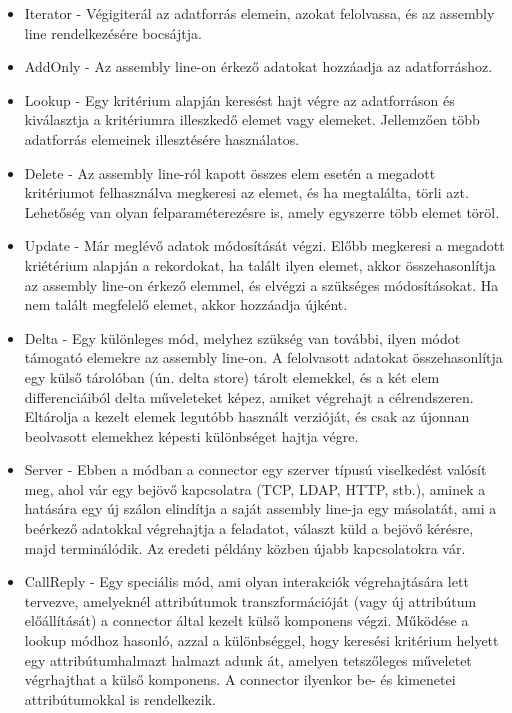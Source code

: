 \begin{itemize}
	\item Iterator - Végigiterál az adatforrás elemein, azokat felolvassa, és az assembly line rendelkezésére bocsájtja.
	
	\item AddOnly - Az assembly line-on érkező adatokat hozzáadja az adatforráshoz.
	
	\item Lookup - Egy kritérium alapján keresést hajt végre az adatforráson és kiválasztja a kritériumra illeszkedő elemet vagy elemeket. Jellemzően több adatforrás elemeinek illesztésére használatos.
	
	\item Delete - Az assembly line-ról kapott összes elem esetén a megadott kritériumot felhasználva megkeresi az elemet, és ha megtalálta, törli azt. Lehetőség van olyan felparaméterezésre is, amely egyszerre több elemet töröl.
	
	\item Update - Már meglévő adatok módosítását végzi. Előbb  megkeresi a megadott kriétérium alapján a rekordokat, ha talált ilyen elemet, akkor összehasonlítja az assembly line-on érkező elemmel, és elvégzi a szükséges módosításokat. Ha nem talált megfelelő elemet, akkor hozzáadja újként.
	
	\item Delta - Egy különleges mód, melyhez szükség van további, ilyen módot támogató elemekre az assembly line-on. A felolvasott adatokat összehasonlítja egy külső tárolóban (ún. delta store) tárolt elemekkel, és a két elem differenciáiból delta műveleteket képez, amiket végrehajt a célrendszeren. Eltárolja a kezelt elemek legutóbb használt verzióját, és csak az újonnan beolvasott elemekhez képesti különbséget hajtja végre.
	
	\item Server - Ebben a módban a connector egy szerver típusú viselkedést valósít meg, ahol vár egy bejövő kapcsolatra (TCP, LDAP, HTTP, stb.), aminek a hatására egy új szálon elindítja a saját assembly line-ja egy másolatát, ami a beérkező adatokkal végrehajtja a feladatot, választ küld a bejövő kérésre, majd terminálódik. Az eredeti példány közben újabb kapcsolatokra vár.
	
	\item CallReply - Egy speciális mód, ami olyan interakciók végrehajtására lett tervezve, amelyeknél attribútumok transzformációját (vagy új attribútum előállítását) a connector által kezelt külső komponens végzi. Működése a lookup módhoz hasonló, azzal a különbséggel, hogy keresési kritérium helyett egy attribútumhalmazt halmazt adunk át, amelyen tetszőleges műveletet végrhajthat a külső komponens. A connector ilyenkor be- és kimenetei attribútumokkal is rendelkezik.
\end{itemize}

